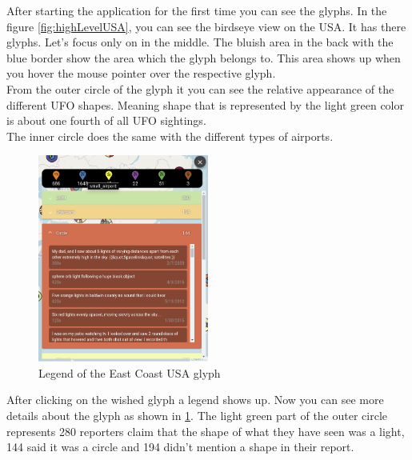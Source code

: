\documentclass{article}
\begin{document}
After starting the application for the first time you can see the glyphs. In the figure \ref{fig:highLevelUSA}, you can see the birdseye view on the USA. It has there glyphs. Let's focus only on in the middle. The bluish area in the back with the blue border show the area which the glyph belongs to. This area shows up when you hover the mouse pointer over the respective glyph.
\\
From the outer circle of the glyph it you can see the relative appearance of the different UFO shapes. Meaning shape that is represented by the light green color is about one fourth of all UFO sightings.
\\
The inner circle does the same with the different types of airports.
\\

\begin{figure} 
    \centering
    \includegraphics[width=0.5\textwidth]{legendEastCostUsa2}
    \caption{Legend of the East Coast USA glyph}
    \label{fig:legendEastCostUsa2}
\end{figure}

After clicking on the wished glyph a legend shows up. 
Now you can see more details about the glyph as shown in \ref{fig:legendEastCostUsa2}. 
The light green part of the outer circle represents 280 reporters claim that the shape 
of what they have seen was a light, 144 said it was a circle and 194 
didn't mention a shape in their report. \\
\end{document}
